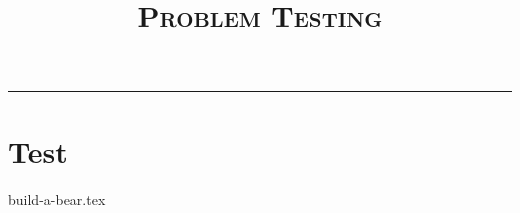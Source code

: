 \documentclass{exam}
\title{\textsc{Problem Testing}}
\begin{document}
\maketitle
\rule{\textwidth}{0.15em}
\fontsize{12}{15}\selectfont

\section{Test}
\begin{questions}
{build-a-bear.tex}
\end{questions}
\end{document}
